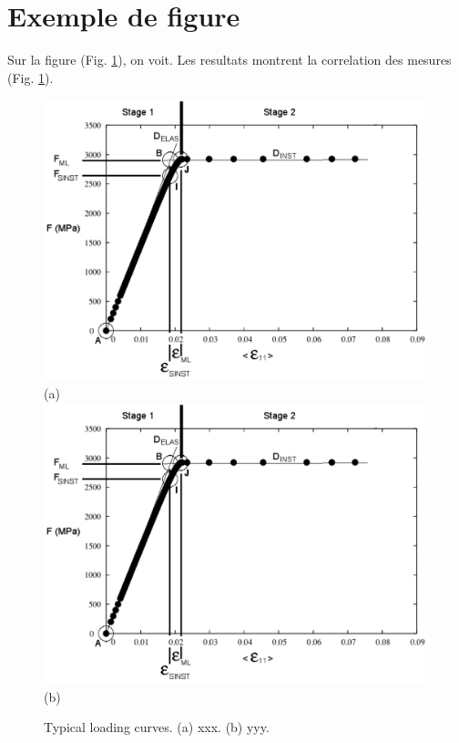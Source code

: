 \section{Exemple de figure} \label{section_chapter_xxx_exemple_de_figure}

Sur la figure (Fig. \ref{figure_chapter_xxx_lelabel}), on voit.
Les resultats montrent la correlation des mesures (Fig. \ref{figure_chapter_xxx_lelabel}).

\begin{figure}[!ht]
	\begin{center}
		\includegraphics[scale=0.26]{chapters/chapter_model_mise_en_page/figures/figure_1.pdf} \\
		(a) \\
		\includegraphics[scale=0.26]{chapters/chapter_model_mise_en_page/figures/figure_1.pdf} \\
		(b)
		\caption{
		\label{figure_chapter_xxx_lelabel}
			Typical loading curves. (a) xxx. (b) yyy.
		}
	\end{center}
\end{figure}


